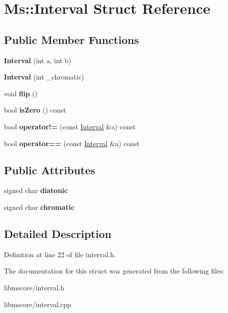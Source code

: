 \hypertarget{struct_ms_1_1_interval}{}\section{Ms\+:\+:Interval Struct Reference}
\label{struct_ms_1_1_interval}
\subsection*{Public Member Functions}
\begin{DoxyCompactItemize}
\item 
\mbox{\label{struct_ms_1_1_interval_a345d9208a457171f028afe0990ed4db1}} 
{\bfseries Interval} (int a, int b)
\item 
\mbox{\label{struct_ms_1_1_interval_ab7df8dfc41ca993dc34a49c240c9f4a2}} 
{\bfseries Interval} (int \+\_\+chromatic)
\item 
\mbox{\label{struct_ms_1_1_interval_a5328777c69fa5e64a1f816d7efe4ce44}} 
void {\bfseries flip} ()
\item 
\mbox{\label{struct_ms_1_1_interval_a052ec18712aa2f59c34f4a7c47329c3e}} 
bool {\bfseries is\+Zero} () const
\item 
\mbox{\label{struct_ms_1_1_interval_af5ce61f3468975c61bc383c8883f3698}} 
bool {\bfseries operator!=} (const \hyperlink{struct_ms_1_1_interval}{Interval} \&a) const
\item 
\mbox{\label{struct_ms_1_1_interval_a62cac96ca1d3349e77b00941de2110eb}} 
bool {\bfseries operator==} (const \hyperlink{struct_ms_1_1_interval}{Interval} \&a) const
\end{DoxyCompactItemize}
\subsection*{Public Attributes}
\begin{DoxyCompactItemize}
\item 
\mbox{\label{struct_ms_1_1_interval_a54024eb8b718cfea4c81522664ad50a9}} 
signed char {\bfseries diatonic}
\item 
\mbox{\label{struct_ms_1_1_interval_a251c3700b32300c766246519b91ae94c}} 
signed char {\bfseries chromatic}
\end{DoxyCompactItemize}


\subsection{Detailed Description}


Definition at line 22 of file interval.\+h.



The documentation for this struct was generated from the following files\+:\begin{DoxyCompactItemize}
\item 
libmscore/interval.\+h\item 
libmscore/interval.\+cpp\end{DoxyCompactItemize}

